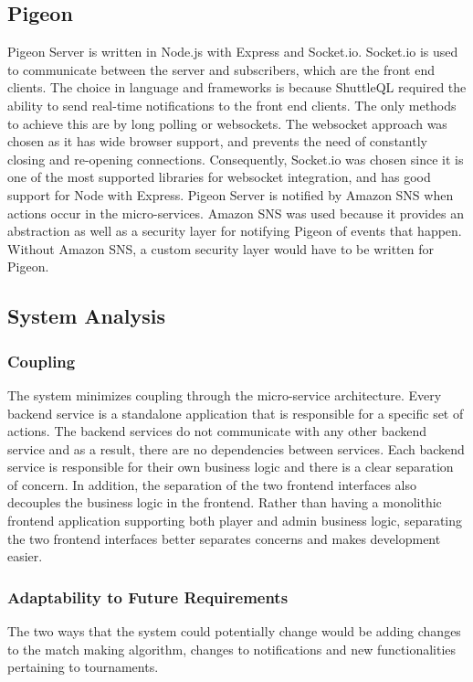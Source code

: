 \documentclass{article}
\begin{document}
\subsection{Pigeon}
Pigeon Server is written in Node.js with Express and Socket.io. Socket.io is used to communicate between the server and subscribers, which are the front end clients. The choice in language and frameworks is because ShuttleQL required the ability to send real-time notifications to the front end clients. The only methods to achieve this are by long polling or websockets. The websocket approach was chosen as it has wide browser support, and prevents the need of constantly closing and re-opening connections. Consequently, Socket.io was chosen since it is one of the most supported libraries for websocket integration, and has good support for Node with Express. Pigeon Server is notified by Amazon SNS when actions occur in the micro-services. Amazon SNS was used because it provides an abstraction as well as a security layer for notifying Pigeon of events that happen. Without Amazon SNS, a custom security layer would have to be written for Pigeon.

\subsection{System Analysis}

\subsubsection{Coupling}
The system minimizes coupling through the micro-service architecture. Every backend service is a standalone application that is responsible for a specific set of actions. The backend services do not communicate with any other backend service and as a result, there are no dependencies between services. Each backend service is responsible for their own business logic and there is a clear separation of concern. In addition, the separation of the two frontend interfaces also decouples the business logic in the frontend. Rather than having a monolithic frontend application supporting both player and admin business logic, separating the two frontend interfaces better separates concerns and makes development easier.

\subsubsection{Adaptability to Future Requirements}
The two ways that the system could potentially change would be adding changes to the match making algorithm, changes to notifications and new functionalities pertaining to tournaments.
\end{document}
